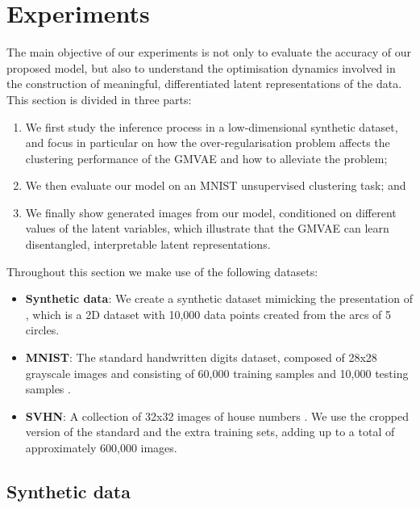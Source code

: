 \documentclass{article} \usepackage{iclr2017_conference,times}
\begin{document}
\section{Experiments}

The main objective of our experiments is not only to evaluate the accuracy of our proposed model, but also to understand the optimisation dynamics involved in the construction of meaningful, differentiated latent representations of the data. This section is divided in three parts:

\begin{enumerate}
\item We first study the inference process in a low-dimensional synthetic dataset, and focus in particular on how the over-regularisation problem affects the clustering performance of the GMVAE and how to alleviate the problem;

\item We then evaluate our model on an MNIST unsupervised clustering task; and

\item We finally show generated images from our model, conditioned on different values of the latent variables, which illustrate that the GMVAE can learn disentangled, interpretable latent representations.
\end{enumerate}

Throughout this section we make use of the following datasets:

\begin{itemize}
\item \textbf{Synthetic data}: We create a synthetic dataset mimicking the presentation of \cite{johnson2016composing}, which is a 2D dataset with 10,000 data points created from the arcs of 5 circles.

\item \textbf{MNIST}: The standard handwritten digits dataset, composed of 28x28 grayscale images and consisting of 60,000 training samples and 10,000 testing samples \citep{lecun1998gradient}.

\item \textbf{SVHN}: A collection of 32x32 images of house numbers \citep{netzer2011reading}. We use the cropped version of the standard and the extra training sets, adding up to a total of approximately 600,000 images.
\end{itemize}

\subsection{Synthetic data}
\end{document}
